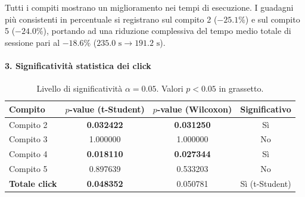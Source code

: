 \vspace{-2mm}
\noindent\small Tutti i compiti mostrano un miglioramento nei tempi di esecuzione. I guadagni più consistenti in percentuale si registrano sul compito 2 ($-25.1\%$) e sul compito 5 ($-24.0\%$), portando ad una riduzione complessiva del tempo medio totale di sessione pari al $-18.6\%$ ($235.0\text{ s} \to 191.2\text{ s}$).

\newpage
\paragraph{3. Significatività statistica dei click}\mbox{}\par\vspace{0.5ex}

\begin{table}[h!]
    \centering
    \small
    \begin{tabular}{lccc}
        \toprule
        \textbf{Compito} & \textbf{$p$-value (t-Student)} & \textbf{$p$-value (Wilcoxon)} & \textbf{Significativo} \\
        \midrule
        Compito 2 & \textbf{0.032422} & \textbf{0.031250} & Sì \\
        Compito 3 & 1.000000          & 1.000000          & No \\
        Compito 4 & \textbf{0.018110} & \textbf{0.027344} & Sì \\
        Compito 5 & 0.897639          & 0.533203          & No \\
        \midrule
        \textbf{Totale click} & \textbf{0.048352} & 0.050781 & Sì (t-Student) \\
        \bottomrule
    \end{tabular}
    \caption*{\small Livello di significatività $\alpha = 0.05$. Valori $p < 0.05$ in grassetto.}
\end{table}

